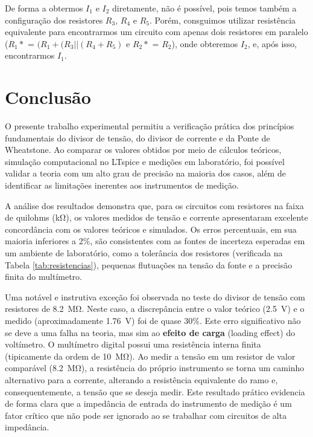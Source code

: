 \documentclass[a4paper, 12pt]{article}
\begin{document}
De forma a obtermos $I_1$ e $I_2$ diretamente, não é possível, pois temos também a configuração dos resistores $R_3$, $R_4$ e $R_5$. Porém, consguimos utilizar resistência equivalente para encontrarmos um circuito com apenas dois resistores em paralelo ($R_1*$ = $(R_1+(R_3||(R_4+R_5)$ e $R_2*$ = $R_2$), onde obteremos $I_2$, e, após isso, encontrarmos $I_1$. 

\section{Conclusão}
O presente trabalho experimental permitiu a verificação prática dos princípios fundamentais do divisor de tensão, do divisor de corrente e da Ponte de Wheatstone. Ao comparar os valores obtidos por meio de cálculos teóricos, simulação computacional no LTspice e medições em laboratório, foi possível validar a teoria com um alto grau de precisão na maioria dos casos, além de identificar as limitações inerentes aos instrumentos de medição.

A análise dos resultados demonstra que, para os circuitos com resistores na faixa de quilohms (\si{\kilo\ohm}), os valores medidos de tensão e corrente apresentaram excelente concordância com os valores teóricos e simulados. Os erros percentuais, em sua maioria inferiores a 2\%, são consistentes com as fontes de incerteza esperadas em um ambiente de laboratório, como a tolerância dos resistores (verificada na Tabela \ref{tab:resistencias}), pequenas flutuações na tensão da fonte e a precisão finita do multímetro.

Uma notável e instrutiva exceção foi observada no teste do divisor de tensão com resistores de \SI{8,2}{\mega\ohm}. Neste caso, a discrepância entre o valor teórico (\SI{2,5}{\volt}) e o medido (aproximadamente \SI{1,76}{\volt}) foi de quase 30\%. Este erro significativo não se deve a uma falha na teoria, mas sim ao \textbf{efeito de carga} (loading effect) do voltímetro. O multímetro digital possui uma resistência interna finita (tipicamente da ordem de \SI{10}{\mega\ohm}). Ao medir a tensão em um resistor de valor comparável (\SI{8,2}{\mega\ohm}), a resistência do próprio instrumento se torna um caminho alternativo para a corrente, alterando a resistência equivalente do ramo e, consequentemente, a tensão que se deseja medir. Este resultado prático evidencia de forma clara que a impedância de entrada do instrumento de medição é um fator crítico que não pode ser ignorado ao se trabalhar com circuitos de alta impedância.
\end{document}
